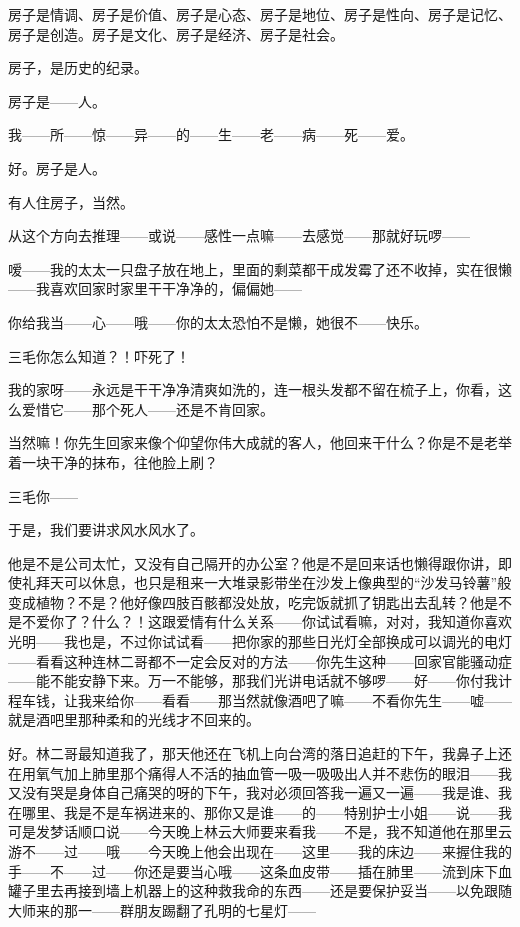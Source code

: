 \par 房子是情调、房子是价值、房子是心态、房子是地位、房子是性向、房子是记忆、房子是创造。房子是文化、房子是经济、房子是社会。
\par 房子，是历史的纪录。
\par 房子是——人。
\par 我——所——惊——异——的——生——老——病——死——爱。
\par 好。房子是人。
\par 有人住房子，当然。
\par 从这个方向去推理——或说——感性一点嘛——去感觉——那就好玩啰——
\par 嗳——我的太太一只盘子放在地上，里面的剩菜都干成发霉了还不收掉，实在很懒——我喜欢回家时家里干干净净的，偏偏她——
\par 你给我当——心——哦——你的太太恐怕不是懒，她很不——快乐。
\par 三毛你怎么知道？！吓死了！
\par 我的家呀——永远是干干净净清爽如洗的，连一根头发都不留在梳子上，你看，这么爱惜它——那个死人——还是不肯回家。
\par 当然嘛！你先生回家来像个仰望你伟大成就的客人，他回来干什么？你是不是老举着一块干净的抹布，往他脸上刷？
\par 三毛你——
\par 于是，我们要讲求风水风水了。
\par 他是不是公司太忙，又没有自己隔开的办公室？他是不是回来话也懒得跟你讲，即使礼拜天可以休息，也只是租来一大堆录影带坐在沙发上像典型的“沙发马铃薯”般变成植物？不是？他好像四肢百骸都没处放，吃完饭就抓了钥匙出去乱转？他是不是不爱你了？什么？！这跟爱情有什么关系——你试试看嘛，对对，我知道你喜欢光明——我也是，不过你试试看——把你家的那些日光灯全部换成可以调光的电灯——看看这种连林二哥都不一定会反对的方法——你先生这种——回家官能骚动症——能不能安静下来。万一不能够，那我们光讲电话就不够啰——好——你付我计程车钱，让我来给你——看看——那当然就像酒吧了嘛——不看你先生——嘘——就是酒吧里那种柔和的光线才不回来的。
\par 好。林二哥最知道我了，那天他还在飞机上向台湾的落日追赶的下午，我鼻子上还在用氧气加上肺里那个痛得人不活的抽血管一吸一吸吸出人并不悲伤的眼泪——我又没有哭是身体自己痛哭的呀的下午，我对必须回答我一遍又一遍——我是谁、我在哪里、我是不是车祸进来的、那你又是谁——的——特别护士小姐——说——我可是发梦话顺口说——今天晚上林云大师要来看我——不是，我不知道他在那里云游不——过——哦——今天晚上他会出现在——这里——我的床边——来握住我的手——不——过——你还是要当心哦——这条血皮带——插在肺里——流到床下血罐子里去再接到墙上机器上的这种救我命的东西——还是要保护妥当——以免跟随大师来的那一——群朋友踢翻了孔明的七星灯——
